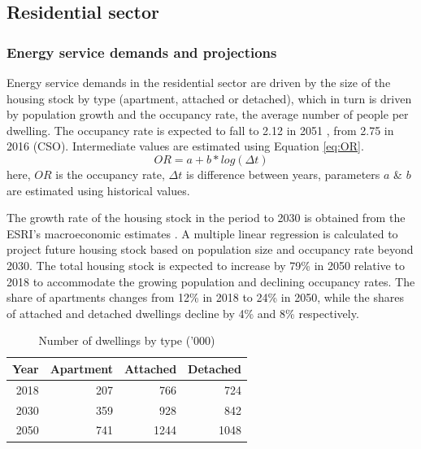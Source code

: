 \documentclass[journal abbreviation, manuscript]{copernicus}
\begin{document}
\clearpage

\subsection{Residential sector}
\label{ss:residential}
\subsubsection{Energy service demands and projections}
Energy service demands in the residential sector are driven by the size of the housing stock by type (apartment, attached or detached), which in turn is driven by population growth and the occupancy rate, the average number of people per dwelling. The occupancy rate is expected to fall to 2.12 in 2051 \cite{PropertyIndustryIreland2019}, from 2.75 in 2016 (CSO). Intermediate values are estimated using Equation \ref{eq:OR}.
\begin{equation}
\label{eq:OR}
 OR= a+b*log(\Delta t)
\end{equation}
here, $OR$ is the occupancy rate, $\Delta t$ is difference between years, parameters $a$ \& $b$ are estimated using historical values. 

The growth rate of the housing stock in the period to 2030 is obtained from the ESRI's macroeconomic estimates \cite{Yakut2020}. 
A multiple linear regression is calculated to project future housing stock based on population size and occupancy rate beyond 2030. The total housing stock is expected to increase by 79\% in 2050 relative to 2018 to accommodate the growing population and declining occupancy rates. The share of apartments changes from 12\% in 2018 to 24\% in 2050, while the shares of attached and detached dwellings decline by 4\% and 8\% respectively.

\begin{table}[htbp]
 \centering
 \footnotesize
 \caption{Number of dwellings by type ('000)}
 \begin{tabular}{rrrr}
 \hline
 \multicolumn{1}{l}{Year} & \multicolumn{1}{l}{Apartment} & \multicolumn{1}{l}{Attached} & \multicolumn{1}{l}{Detached} \\ \hline
 2018 & 207 & 766 & 724 \\
 2030 & 359 & 928 & 842 \\
 2050 & 741 & 1244 & 1048 \\ \hline
 \end{tabular}%
 \label{tab:house}%
\end{table}%
\end{document}

